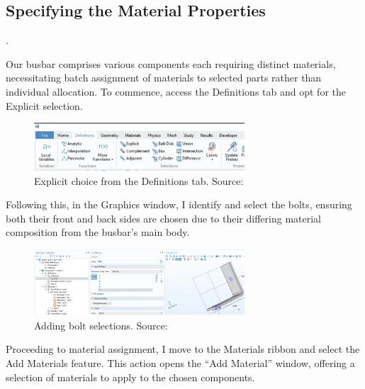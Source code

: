 \subsection{Specifying the Material Properties}.

Our busbar comprises various components each requiring distinct materials, necessitating batch assignment of materials to selected parts rather than individual allocation. To commence, access the Definitions tab and opt for the Explicit selection.

\begin{figure}[H]
  \centering
  \includegraphics[width=0.7\textwidth]{Chapters/Figures/Chapter 3 Figures/Explicit Choice Selection from Definitions Tab.png}
  \caption{Explicit choice from the Definitions tab. Source: \cite{multiphysics__modeling_nodate}}
  \label{fig:Explicit choice from the Definitions tab.}
\end{figure}

Following this, in the Graphics window, I identify and select the bolts, ensuring both their front and back sides are chosen due to their differing material composition from the busbar's main body.

\begin{figure}[H]
  \centering
  \includegraphics[width=0.7\textwidth]{Chapters/Figures/Chapter 3 Figures/Bolts Selection.png}
  \caption{Adding bolt selections. Source: \cite{multiphysics__modeling_nodate}}
  \label{fig:Adding bolt selections}
\end{figure}

Proceeding to material assignment, I move to the Materials ribbon and select the Add Materials feature. This action opens the ``Add Material'' window, offering a selection of materials to apply to the chosen components.

